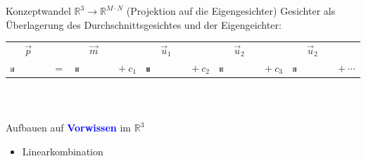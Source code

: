 \documentclass[10pt,aspectratio=169]{beamer}
\begin{document}
\begin{frame}[fragile]{Konzeptwandel $\mathbb R^3\longrightarrow\mathbb R^{M\cdot N}$ (Projektion auf die Eigengesichter)}
	Gesichter als Überlagerung des Durchschnittsgesichtes und der Eigengeichter:\\[0.5cm]
	\begin{tabular}{m{1.3cm} c m{1.3cm} c m{1.3cm} c m{1.3cm} c m{1.3cm} c}
		$\quad\ \ \vec p$ & & $\quad\ \ \vec m$ & & $\quad\ \ \vec u_1$ & & $\quad\ \ \vec u_2$ & & $\quad\ \ \vec u_2$ & \\
		\includegraphics[width=0.1\textwidth]{images/eigenfaces/mona_lisa_eigen_approx} &
		$=$ & \includegraphics[width=0.1\textwidth]{images/facespace/meanface} & $+\ c_1$ & \includegraphics[width=0.1\textwidth]{images/eigenfaces/eigenface00}
		& $+\ c_2$ & \includegraphics[width=0.1\textwidth]{images/eigenfaces/eigenface01} & $+\ c_3$ & \includegraphics[width=0.1\textwidth]{images/eigenfaces/eigenface02} & $+\ \cdots$
	\end{tabular}\\[0.5cm]
	\begin{minipage}{0.45\textwidth}
		\begin{columns}[T,onlytextwidth]
			\column{\textwidth}
			\begin{block}{Aufbauen auf \textcolor{blue}{\textbf{Vorwissen}} im $\mathbb R^3$}
				\begin{itemize}
					\item Linearkombination

\end{itemize}
\end{block}
\end{columns}
\end{minipage}
\end{frame}
\end{document}
